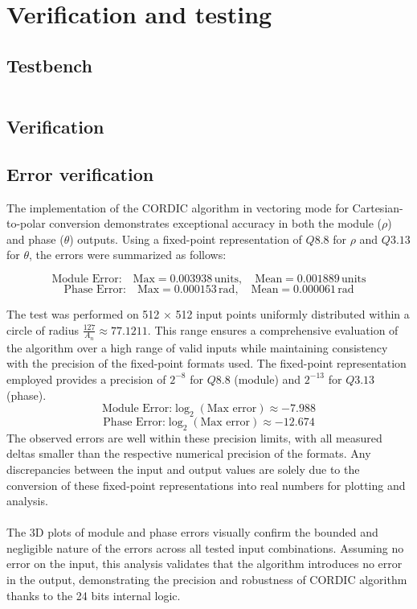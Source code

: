 \chapter{Verification and testing}

\section{Testbench}



\begin{code}
    \inputminted{vhdl}{listings/04/CORDIC_tb.vhd}
    \label{code:testbench}
\end{code}

\section{Verification}

\section{Error verification}
The implementation of the CORDIC algorithm in vectoring mode for Cartesian-to-polar conversion demonstrates 
exceptional accuracy in both the module (\( \rho \)) and phase (\( \theta \)) outputs. Using a fixed-point 
representation of \( Q8.8 \) for \( \rho \) and \( Q3.13 \) for \( \theta \), the errors were summarized as follows:

\[
\text{Module Error:} \quad \text{Max} = 0.003938 \, \text{units}, \quad \text{Mean} = 0.001889 \, \text{units}
\]
\[
\text{Phase Error:} \quad \text{Max} = 0.000153 \, \text{rad}, \quad \text{Mean} = 0.000061 \, \text{rad}
\]

The test was performed on 512 × 512 input points uniformly distributed within a circle of radius \( \frac{127}{A_n} \approx 77.1211 \). 
This range ensures a comprehensive evaluation of the algorithm over a high range of valid inputs while maintaining 
consistency with the precision of the fixed-point formats used. The fixed-point representation employed provides a precision 
of \( 2^{-8} \) for \( Q8.8 \) (module) and \( 2^{-13} \) for \( Q3.13 \) (phase). 
\[
    \text{Module Error:} \log_2(\text{Max error}) \approx -7.988
\]
\[
    \text{Phase Error:} \log_2(\text{Max error}) \approx -12.674
\]
The observed errors are well within these precision limits, with all measured deltas smaller than the respective numerical precision of the formats. Any discrepancies between the input and output values are solely due to the conversion of these fixed-point representations into real numbers for plotting and analysis. 
\\\\
The 3D plots of module and phase errors visually confirm the bounded and negligible nature of the errors across 
all tested input combinations. Assuming no error on the input, this analysis validates that the algorithm introduces 
no error in the output, demonstrating the precision and robustness of CORDIC algorithm thanks to the 24 bits internal logic.

